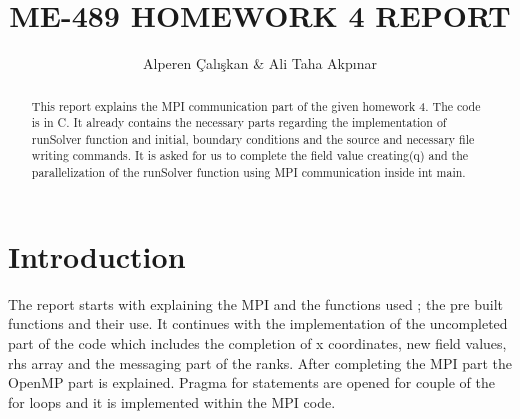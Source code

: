 \documentclass{article}
\title{ME-489 HOMEWORK 4 REPORT}
\author{Alperen Çalışkan & Ali Taha Akpınar}
\begin{document}
\maketitle
\begin{abstract}
This report explains the MPI communication part of the given homework 4. The code is in C. It already contains the necessary parts regarding the implementation of runSolver function and initial, boundary conditions and the source and necessary file writing commands. It is asked for us to complete the field value creating(q) and the parallelization of the runSolver function using MPI communication inside int main.

\end{abstract}

\section{Introduction}
The report starts with explaining the MPI and the functions used ; the pre built functions and their use. It continues with the implementation of the uncompleted part of the code which includes the completion of x coordinates, new field values, rhs array and the messaging part of the ranks. After completing the MPI part the OpenMP part is explained. Pragma for statements are opened for couple of the for loops and it is implemented within the MPI code. 
\end{document}
